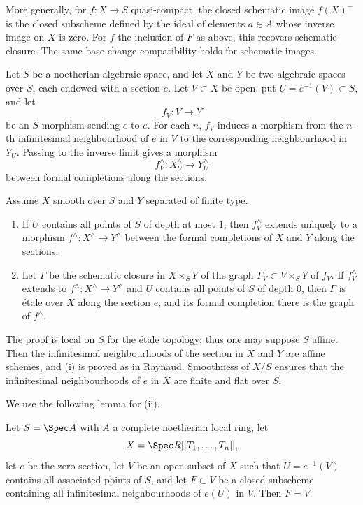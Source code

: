 More generally, for $f:X\to S$ quasi-compact, the closed schematic image $f(X)^-$ is the closed subscheme defined by the ideal of elements $a\in A$ whose inverse image on $X$ is zero. For $f$ the inclusion of $F$ as above, this recovers schematic closure. The same base-change compatibility holds for schematic images.

Let $S$ be a noetherian algebraic space, and let $X$ and $Y$ be two algebraic spaces over $S$, each endowed with a section $e$. Let $V\subset X$ be open, put $U=e^{-1}(V)\subset S$, and let
\[
  f_V:V\longrightarrow Y
\]
be an $S$-morphism sending $e$ to $e$. For each $n$, $f_V$ induces a morphism from the $n$-th infinitesimal neighbourhood of $e$ in $V$ to the corresponding neighbourhood in $Y_U$. Passing to the inverse limit gives a morphism
\[
  f_V^\wedge:X_U^\wedge\longrightarrow Y_U^\wedge
\]
between formal completions along the sections.

\begin{proposition}\label{prop:formal-graph}
Assume $X$ smooth over $S$ and $Y$ separated of finite type.
\begin{enumerate}[label=(\roman*)]
\item If $U$ contains all points of $S$ of depth at most $1$, then $f_V^\wedge$ extends uniquely to a morphism $f^\wedge:X^\wedge\to Y^\wedge$ between the formal completions of $X$ and $Y$ along the sections.
\item Let $\Gamma$ be the schematic closure in $X\times_S Y$ of the graph $\Gamma_V\subset V\times_S Y$ of $f_V$. If $f_V^\wedge$ extends to $f^\wedge:X^\wedge\to Y^\wedge$ and $U$ contains all points of $S$ of depth $0$, then $\Gamma$ is étale over $X$ along the section $e$, and its formal completion there is the graph of $f^\wedge$.
\end{enumerate}
\end{proposition}

The proof is local on $S$ for the étale topology; thus one may suppose $S$ affine. Then the infinitesimal neighbourhoods of the section in $X$ and $Y$ are affine schemes, and (i) is proved as in Raynaud. Smoothness of $X/S$ ensures that the infinitesimal neighbourhoods of $e$ in $X$ are finite and flat over $S$.

We use the following lemma for (ii).

\begin{lemma}\label{lem:formal-density}
Let $S=\Spec A$ with $A$ a complete noetherian local ring, let
\[
  X=\Spec R[[T_1,\ldots,T_n]],
\]
let $e$ be the zero section, let $V$ be an open subset of $X$ such that $U=e^{-1}(V)$ contains all associated points of $S$, and let $F\subset V$ be a closed subscheme containing all infinitesimal neighbourhoods of $e(U)$ in $V$. Then $F=V$.
\end{lemma}


